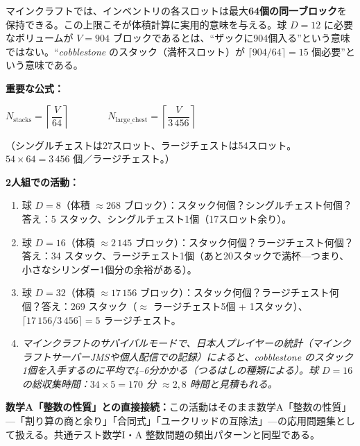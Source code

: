 \documentclass[12pt,a4paper]{scrartcl}
\newcommand{\acc}[1]{\textcolor{accent}{\textbf{#1}}}
\newcommand{\tempo}[1]{\textnormal{\footnotesize\color{bg!90!white}\textsf{#1}}}
\begin{document}
\begin{katsudou}[4.1 --- スタック算法 \quad\tempo{15分}]\label{at:41}
マインクラフトでは、インベントリの各スロットは最大\acc{64個の同一ブロック}を保持できる。この上限こそが体積計算に実用的意味を与える。球 $D=12$ に必要なボリュームが $V = 904$ ブロックであるとは、\enquote{ザックに904個入る}という意味ではない。\enquote{\emph{cobblestone} のスタック（満杯スロット）が $\lceil 904/64 \rceil = 15$ 個必要}という意味である。

\textbf{重要な公式：}

\begin{shiki}
\centering
$\displaystyle N_{\mathrm{stacks}} = \left\lceil \dfrac{V}{64} \right\rceil
\qquad\qquad
N_{\mathrm{large\_chest}} = \left\lceil \dfrac{V}{3\,456} \right\rceil$
\end{shiki}

（シングルチェストは27スロット、ラージチェストは54スロット。$54 \times 64 = 3\,456$ 個／ラージチェスト。）

\textbf{2人組での活動：}
\begin{enumerate}[leftmargin=1.5em,itemsep=0.15em,topsep=0.3em,nosep]
  \item 球 $D = 8$（体積 $\approx 268$ ブロック）：スタック何個？シングルチェスト何個？答え：5 スタック、シングルチェスト1個（17スロット余り）。
  \item 球 $D = 16$（体積 $\approx 2\,145$ ブロック）：スタック何個？ラージチェスト何個？答え：34 スタック、ラージチェスト1個（あと20スタックで満杯---つまり、小さなシリンダー1個分の余裕がある）。
  \item 球 $D = 32$（体積 $\approx 17\,156$ ブロック）：スタック何個？ラージチェスト何個？答え：269 スタック（$\approx$ ラージチェスト5個 + 1スタック）、$\lceil 17\,156/3\,456 \rceil = 5$ ラージチェスト。
  \item \emph{マインクラフトのサバイバルモードで、日本人プレイヤーの統計（マインクラフトサーバー\emph{JMS}や個人配信での記録）によると、cobblestone のスタック1個を入手するのに平均で4--6分かかる（つるはしの種類による）。球 $D = 16$ の総収集時間：$34 \times 5 = 170$ 分 $\approx 2{,}8$ 時間と見積もれる。}
\end{enumerate}

\textbf{数学A「整数の性質」との直接接続：}この活動はそのまま数学A「整数の性質」---「割り算の商と余り」「合同式」「ユークリッドの互除法」---の応用問題集として扱える。共通テスト数学I・A 整数問題の頻出パターンと同型である。
\end{katsudou}
\end{document}
